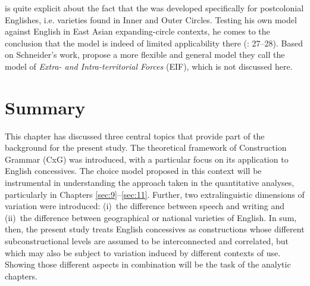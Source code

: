 \begin{sloppypar}
\citet[10, 16]{Schneider2014} is quite explicit about the fact that the  was developed specifically for postcolonial Englishes, i.e. varieties found in  Inner and Outer Circles. Testing his own model against English in East Asian expanding-circle contexts, he comes to the conclusion that the model is indeed of limited applicability there (\citealt{Schneider2014}: 27–28). Based on Schneider’s work, \citet{BuschfeldKautzsch2017} propose a more flexible and general model they call the model of \textit{Extra- and Intra-territorial Forces} (EIF), which is not discussed here.
\end{sloppypar}

\section{Summary}\label{sec:4.4}

This chapter has discussed three central topics that provide part of the background for the present study. The theoretical framework of Construction Grammar (CxG) was introduced, with a particular focus on its application to English concessives. The choice model proposed in this context will be instrumental in understanding the approach taken in the quantitative analyses, particularly in Chapters \ref{sec:9}–\ref{sec:11}. Further, two extralinguistic dimensions of variation were introduced:
(i)~the difference between speech and writing and
(ii)~the difference between geographical or national varieties of English. In sum, then, the present study treats English concessives as constructions whose different subconstructional levels are assumed to be interconnected and correlated, but which may also be subject to variation induced by different contexts of use. Showing those different aspects in combination will be the task of the analytic chapters.
